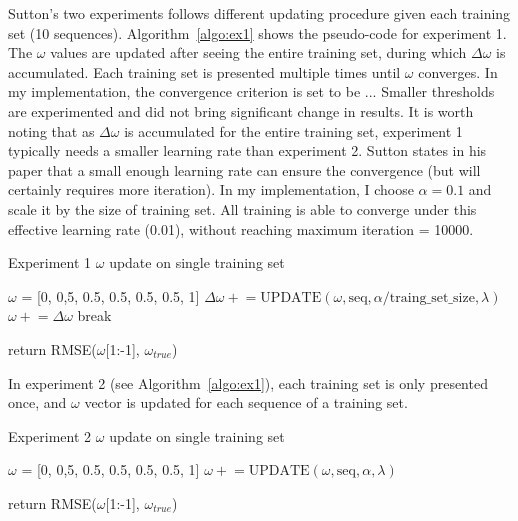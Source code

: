 \documentclass{article}
\newcommand{\pluseq}{\mathrel{+}=}
\begin{document}
Sutton's two experiments follows different updating procedure given each training set (10 sequences). Algorithm~\ref{algo:ex1} shows the pseudo-code for experiment 1. The $\omega$ values are updated after seeing the entire training set, during which $\Delta \omega$ is accumulated. Each training set is presented multiple times until $\omega$ converges. In my implementation, the convergence criterion is set to be ... Smaller thresholds are experimented and did not bring significant change in results. It is worth noting that as $\Delta \omega$ is accumulated for the entire training set, experiment 1 typically needs a smaller learning rate than experiment 2. Sutton states in his paper that a small enough learning rate can ensure the convergence (but will certainly requires more iteration). In my implementation, I choose $\alpha=0.1$ and scale it by the size of training set. All training is able to converge under this effective learning rate (0.01), without reaching maximum iteration = 10000.


\begin{algorithm}[h!]
\caption{Experiment 1 $\omega$ update on single training set}
\begin{algorithmic}
    \State $\omega$ = [0, 0,5, 0.5, 0.5, 0.5, 0.5, 1]
            \State $\Delta \omega \pluseq \mathrm{UPDATE}(\omega, \mathrm{seq}, \alpha/\mathrm{traing\_set\_size}, \lambda)$
        \EndFor
        \State $\omega \pluseq \Delta \omega$
            \State break
        \EndIf
    \EndFor
    
    \State return RMSE($\omega$[1:-1], $\omega_{true}$)
\EndFunction
\end{algorithmic}
\label{algo:ex1}
\end{algorithm}

In experiment 2 (see Algorithm~\ref{algo:ex1}), each training set is only presented once, and $\omega$ vector is updated for each sequence of a training set.

\begin{algorithm}[h!]
\caption{Experiment 2 $\omega$ update on single training set}
\begin{algorithmic}
    \State $\omega$ = [0, 0,5, 0.5, 0.5, 0.5, 0.5, 1]
        \State $\omega \pluseq \mathrm{UPDATE}(\omega, \mathrm{seq}, \alpha, \lambda)$
    \EndFor
    
    \State return RMSE($\omega$[1:-1], $\omega_{true}$)
\EndFunction
\end{algorithmic}
\label{algo:ex2}
\end{algorithm}
\end{document}
